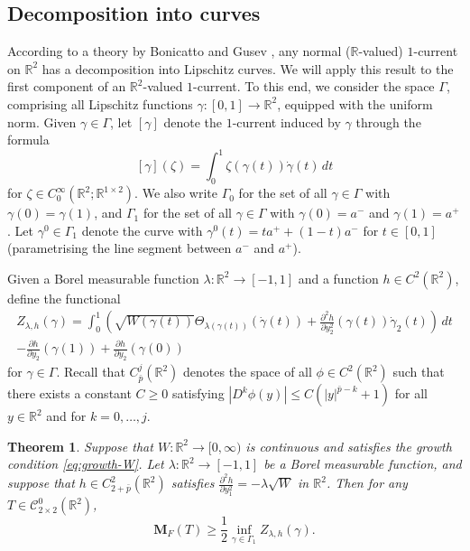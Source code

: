 \documentclass[a4paper]{article}
\newcommand{\R}{\mathbb{R}}
\newcommand{\M}{\mathbf{M}}
\newcommand{\ncrt}{\mathcal{C}}
\newcommand{\dd}[2]{\frac{\partial #1}{\partial #2}}
\newtheorem{theorem}{Theorem}
\theoremstyle{definition}
\theoremstyle{remark}
\begin{document}
\subsection{Decomposition into curves}

According to a theory by Bonicatto and Gusev \cite{Bonicatto-Gusev:22},
any normal ($\R$-valued) $1$-current on $\R^2$ has a decomposition
into Lipschitz curves. We will apply this result to the first component
of an $\R^2$-valued $1$-current. To this end, we consider the space
$\Gamma$, comprising all Lipschitz functions $\gamma \colon [0, 1] \to \R^2$,
equipped with the uniform norm. Given $\gamma \in \Gamma$, let
$[\gamma]$ denote the $1$-current induced by $\gamma$ through the formula
\[
[\gamma](\zeta) = \int_0^1 \zeta(\gamma(t)) \dot{\gamma}(t) \, dt
\]
for $\zeta \in C_0^\infty(\R^2; \R^{1 \times 2})$. We also write
$\Gamma_0$ for the set of all $\gamma \in \Gamma$ with $\gamma(0) = \gamma(1)$,
and $\Gamma_1$ for the set of all $\gamma \in \Gamma$ with $\gamma(0) = a^-$
and $\gamma(1) = a^+$. Let $\gamma^0 \in \Gamma_1$ denote the curve
with $\gamma^0(t) = ta^+ + (1 - t) a^-$ for $t \in [0, 1]$ (parametrising the line
segment between $a^-$ and $a^+$).

Given a Borel measurable function $\lambda \colon \R^2 \to [-1, 1]$ and a
function $h \in C^2(\R^2)$, define the functional
\begin{multline*}
Z_{\lambda, h}(\gamma) = \int_0^1 \left(\sqrt{W(\gamma(t))} \Theta_{\lambda(\gamma(t))}(\dot{\gamma}(t)) + \frac{\partial^2 h}{\partial y_2^2}(\gamma(t)) \dot{\gamma}_2(t)\right) \, dt \\
- \dd{h}{y_2}(\gamma(1)) + \dd{h}{y_2}(\gamma(0))
\end{multline*}
for $\gamma \in \Gamma$. Recall that $C_{\bar{p}}^j(\R^2)$ denotes the space of all
$\phi \in C^2(\R^2)$ such that there exists a constant $C \ge 0$ satisfying $|D^k\phi(y)| \le C(|y|^{\bar{p} - k} + 1)$
for all $y \in \R^2$ and for $k = 0, \dots, j$.

\begin{theorem} \label{thm:decomposition}
Suppose that $W \colon \R^2 \to [0, \infty)$ is continuous and satisfies the growth
condition \eqref{eq:growth-W}. Let $\lambda \colon \R^2 \to [-1, 1]$ be a
Borel measurable function, and suppose that
$h \in C_{2 + \bar{p}}^2(\R^2)$ satisfies $\frac{\partial^2 h}{\partial y_1^2} = -\lambda \sqrt{W}$ in $\R^2$.
Then for any $T \in \ncrt_{2 \times 2}^0(\R^2)$,
\[
\M_F(T) \ge \frac{1}{2} \inf_{\gamma \in \Gamma_1} Z_{\lambda, h}(\gamma).
\]
\end{theorem}
\end{document}
